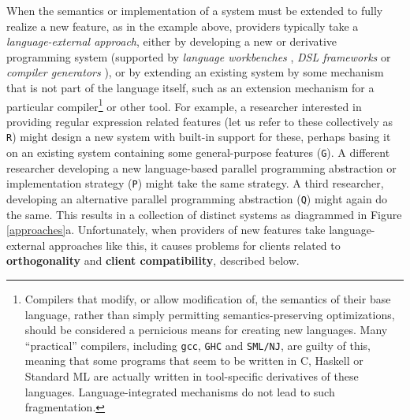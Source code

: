 When the semantics or implementation of a system must be extended to fully realize a new feature, as in the example above, providers typically take a \emph{language-external approach}, either by developing a new or derivative programming system (supported by \emph{language workbenches} \cite{erdweg2013state},  \emph{DSL frameworks} \cite{fowler2010domain} or \emph{compiler generators} \cite{brooker1963compiler}), or by extending an existing system by some mechanism that is not part of the language itself, such as an extension mechanism for a {particular} compiler\footnote{Compilers that modify, or allow modification of, the semantics of their base language, rather than simply permitting semantics-preserving optimizations, should be considered a pernicious means for creating new languages. Many ``practical'' compilers, including \texttt{gcc}, \texttt{GHC} and \texttt{SML/NJ}, are guilty of this, meaning that some programs that seem to be written in C, Haskell or Standard ML are actually written in tool-specific derivatives of these languages. Language-integrated mechanisms do not lead to such fragmentation.} or other tool. For example, a researcher interested in providing regular expression related features (let us refer to these collectively as \texttt{R}) might design a new system with built-in support for these, perhaps basing it on an existing system containing some general-purpose features (\texttt{G}). A different researcher developing a new language-based parallel programming abstraction or implementation strategy (\texttt{P}) might  take the same strategy. A third researcher, developing an alternative parallel programming abstraction (\texttt{Q}) might again do the same. This results in a collection of distinct systems as diagrammed in Figure \ref{approaches}a. Unfortunately, when providers of new features take language-external approaches like this, it causes  problems for clients related to \textbf{orthogonality} and \textbf{client compatibility}, described below. %

